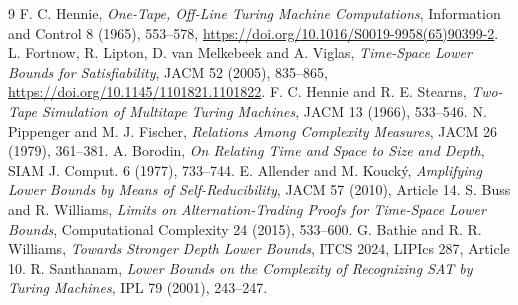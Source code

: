 \documentclass[11pt]{article}
\begin{document}
\begin{thebibliography}{9}\small
{} F. C. Hennie, \emph{One-Tape, Off-Line Turing Machine Computations}, Information and Control 8 (1965), 553--578, \url{https://doi.org/10.1016/S0019-9958(65)90399-2}.
 L. Fortnow, R. Lipton, D. van Melkebeek and A. Viglas, \emph{Time-Space Lower Bounds for Satisfiability}, JACM 52 (2005), 835--865, \url{https://doi.org/10.1145/1101821.1101822}.
 F. C. Hennie and R. E. Stearns, \emph{Two-Tape Simulation of Multitape Turing Machines}, JACM 13 (1966), 533--546.
 N. Pippenger and M. J. Fischer, \emph{Relations Among Complexity Measures}, JACM 26 (1979), 361--381.
 A. Borodin, \emph{On Relating Time and Space to Size and Depth}, SIAM J. Comput. 6 (1977), 733--744.
 E. Allender and M. Kouck\'y, \emph{Amplifying Lower Bounds by Means of Self-Reducibility}, JACM 57 (2010), Article 14.
 S. Buss and R. Williams, \emph{Limits on Alternation-Trading Proofs for Time-Space Lower Bounds}, Computational Complexity 24 (2015), 533--600.
 G. Bathie and R. R. Williams, \emph{Towards Stronger Depth Lower Bounds}, ITCS 2024, LIPIcs 287, Article 10.
 R. Santhanam, \emph{Lower Bounds on the Complexity of Recognizing SAT by Turing Machines}, IPL 79 (2001), 243--247.
\end{thebibliography}
\end{document}
